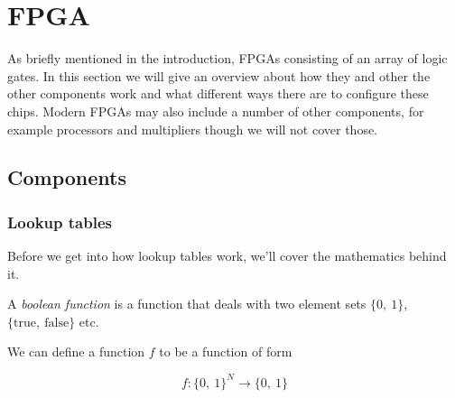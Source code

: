 \chapter{FPGA\label{FPGA}}
As briefly mentioned in the introduction, FPGAs consisting of an array of logic
gates. In this section we will give an overview about how they and other the
other components work and what different ways there are to configure these
chips. Modern FPGAs may also include a number of other components, for example
processors and multipliers though we will not cover those.

\section{Components}
\subsection{Lookup tables}

Before we get into how lookup tables work, we'll cover the mathematics behind
it.

\begin{definition}
    A \textit{boolean function} is a function that deals with two element sets
    $\{0,\ 1\}$, $\{\text{true},\ \text{false}\}$ etc.

    We can define a function $f$ to be a function of form

    \[f \colon \{0,\ 1\}^N \rightarrow \{0,\ 1\}\]

\end{definition}

